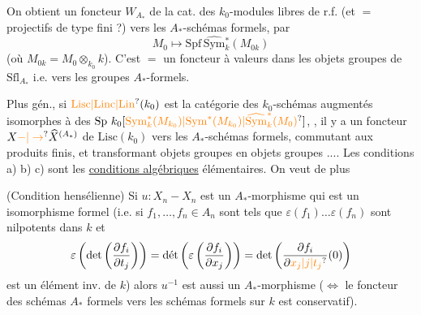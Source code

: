 
 On obtient un foncteur $W_{A_*}$ de la cat. des $k_0$-modules libres de r.f. (et $=$ projectifs de type fini ?) vers les $A_*$-schémas formels, par
\[
 M_0\mapsto\mathrm{Spf}\,\widehat{\mathrm{Sym}}{}_k^*(M_{0k})
\]
(où $M_{0k}=M_0\otimes_{k_0}k$). C'est $=$ un foncteur à valeurs dans les objets groupes de $\mathrm{Sfl}_{A_*}$ i.e. vers les groupes $A_*$-formels.




Plus gén., si $\unsure{\mathrm{Lisc}|\mathrm{Linc}|\mathrm{Lin}}(k_0)$ est la catégorie des $k_0$-schémas augmentés isomorphes à  des  $\mathrm{Sp}\ k_0[\unsure{\mathrm{Sym}_k^*(M_{k_0})|\mathrm{Sym}^*(M_{k_0})|\widehat{\mathrm{Sym}}_k^*(M_0)}]$, , il y a un foncteur $X\unsure{-|\to}\widehat X^{(A_*)}$ de $\mathrm{Lisc}(k_0)$ vers les $A_*$-schémas formels, commutant aux produits finis, et transformant objets groupes en objets groupes ....
Les conditions a) b) c) sont les \uline{conditions algébriques} élémentaires. On veut de plus


 (Condition hensélienne) Si $u:X_n-X_n$ est un $A_*$-morphisme qui est un isomorphisme formel (i.e. si $f_1,\ldots,f_n\in A_n$ sont tels que $\varepsilon(f_1)\ldots\varepsilon(f_n)$ sont nilpotents dans $k$ et
\[
 \varepsilon\left(\det\left(\frac{\partial f_i}{\partial t_j}\right)\right)
 =\text{dét}\left(\varepsilon\left(\frac{\partial f_i}{\partial x_j}\right)\right)
 =\det\left(\frac{\partial f_i}{\partial\unsure{x_j|j|t_j}}(0)\right)
\]
est un élément inv. de $k$) alors $u^{-1}$ est aussi un $A_*$-morphisme ($\Leftrightarrow$ le foncteur des schémas $A_*$ formels vers les schémas formels sur $k$ est conservatif).

